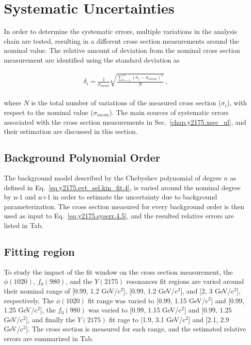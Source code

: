 \section{Systematic Uncertainties}
\label{chap.y2175.syserr}

In order to determine the systematic errors, multiple variations in the analysis chain are tested, resulting in a different cross section measurements around the nominal value. The relative amount of deviation from the nominal cross section measurement are identified using the standard deviation as

\begin{equation}
    \label{eq.y2175.syserr.4.5}
    \begin{aligned}
        \delta_{i} = \frac{1}{\sigma_{mean}} \sqrt{\frac{\sum\limits_{i=1}^{N} (\sigma_{i} - \sigma_{mean})^2}{N}}~,\\
    \end{aligned}
\end{equation}

\noindent where $N$ is the total number of variations of the measured cross section ($\sigma_{i}$), with respect to the nominal value ($\sigma_{mean}$). The main sources of systematic errors associated with the cross section measurements in Sec.~\ref{chap.y2175.xsec_ul}, and their estimation are discussed in this section.

\subsection{Background Polynomial Order}
\label{chap.y2175.syserr.bkg}

The background model described by the Chebyshev polynomial of degree $n$ as defined in Eq.~\ref{eq.y2175.evt_sel.kin_fit.4}, is varied around the nominal degree by $\mbox{n-1}$ and $\mbox{n+1}$ in order to estimate the uncertainty due to background parameterization. The cross section measured for every background order is then used as input to Eq.~\ref{eq.y2175.syserr.4.5}, and the resulted relative errors are listed in Tab.

\subsection{Fitting region}
\label{chap.y2175.syserr.range}

To study the impact of the fit window on the cross section measurement, the $\phi(1020)$, $f_{0}(980)$, and the $Y(2175)$  resonances fit regions are varied around their nominal range of [0.99, 1.2 GeV/c$^2$], [0.99, 1.2 GeV/c$^2$], and [2, 3 GeV/c$^2$], respectively. The $\phi(1020)$ fit range was varied to [0.99, 1.15 GeV/c$^2$] and [0.99, 1.25 GeV/c$^2$], the $f_{0}(980)$ was varied to [0.99, 1.15 GeV/c$^2$] and [0.99, 1.25 GeV/c$^2$], and finally the $Y(2175)$ fit rage to [1.9, 3.1 GeV/c$^2$] and [2.1, 2.9 GeV/c$^2$]. The cross section is measured for each range, and the estimated relative errors are summarized in Tab.

